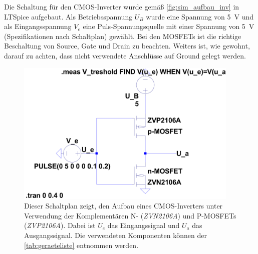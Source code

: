 \documentclass[12pt,english,ngerman]{scrartcl}
\begin{document}
Die Schaltung für den CMOS-Inverter wurde gemäß \autoref{fig:sim_aufbau_inv} in LTSpice aufgebaut.
Als Betriebsspannung $U_B$ wurde eine Spannung von \SI{5}{\volt} und als Eingangsspannung $V_e$
eine Puls-Spannungsquelle mit einer Spannung von \SI{5}{\volt} (Spezifikationen nach Schaltplan) gewählt.
Bei den MOSFETs ist die richtige Beschaltung von Source, Gate und Drain zu beachten.
Weiters ist, wie gewohnt, darauf zu achten, dass nicht verwendete Anschlüsse auf Ground gelegt werden.
\begin{figure}[H]
  \centering
    \includegraphics[width=0.95\textwidth]{./simdaten_lab/cmos/inverter/schaltung.png}
    \caption{Dieser Schaltplan zeigt, den Aufbau eines CMOS-Inverters unter
    Verwendung der Komplementären N- (\textit{ZVN2106A}) und P-MOSFETs
    (\textit{ZVP2106A}). Dabei ist $U_e$ das Eingangssignal und $U_a$ das Ausgangssignal.
    Die verwendeten Komponenten können der \autoref{tab:geraeteliste} entnommen werden.
  }
  \label{fig:sim_aufbau_inv}
\end{figure}
\end{document}
